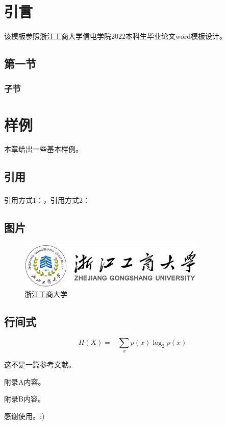 \documentclass{zjgsuthesis}
\begin{document}

\initdoc






\directory
\startdoc


\section{引言}
该模板参照浙江工商大学信电学院2022本科生毕业论文word模板设计。

\subsection{第一节}
\subsubsection{子节}


\section{样例}
本章给出一些基本样例。


\subsection{引用}
引用方式1：\cite{sample}，引用方式2：\textsuperscript{\cite{sample}}


\subsection{图片}
\begin{figure}[htbp]
	\centering
	\includegraphics[width=0.8\textwidth]{zjgsu.png}
	\caption{浙江工商大学}
	\label{zjgsu}
\end{figure}


\subsection{行间式}
\begin{equation}
	H(X)=-\sum_{x}p(x)\log_2p(x)
\end{equation}

\clearpage
\begin{thebibliography}{30}
	\setref
	 这不是一篇参考文献。
\end{thebibliography}



\initappandices
{}
附录A内容。

附录B内容。

\acknowledgment
感谢使用。:)
\end{document}
